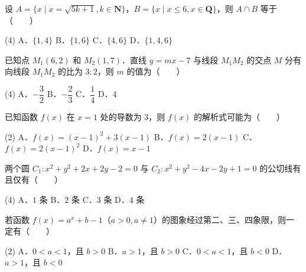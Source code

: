 

\begin{question}
设 $A = \{x \mid x = \sqrt{5k + 1}, k \in \mathbf{N}\}$，$B = \{x \mid x \leqslant 6, x \in \mathbf{Q}\}$，则 $A \cap B$ 等于\mbox{（　　）}

\begin{gkopts}(4)
\task A．$\{1, 4\}$
\task B．$\{1, 6\}$
\task C．$\{4, 6\}$
\task D．$\{1, 4, 6\}$
\end{gkopts}

\end{question}
\begin{question}
已知点 $M_1(6, 2)$ 和 $M_2(1, 7)$．直线 $y = mx - 7$ 与线段 $M_1M_2$ 的交点 $M$ 分有向线段 $M_1M_2$ 的比为 $3 : 2$，则 $m$ 的值为\mbox{（　　）}

\begin{gkopts}(4)
\task A．$-\dfrac{3}{2}$
\task B．$-\dfrac{2}{3}$
\task C．$\dfrac{1}{4}$
\task D．$4$
\end{gkopts}

\end{question}
\begin{question}
已知函数 $f(x)$ 在 $x = 1$ 处的导数为 $3$，则 $f(x)$ 的解析式可能为\mbox{（　　）}

\begin{gkopts}(2)
\task A．$f(x) = (x - 1)^2 + 3(x - 1)$
\task B．$f(x) = 2(x - 1)$
\task C．$f(x) = 2(x - 1)^2$
\task D．$f(x) = x - 1$
\end{gkopts}

\end{question}
\begin{question}
两个圆 $C_1: x^2 + y^2 + 2x + 2y - 2 = 0$ 与 $C_2: x^2 + y^2 - 4x - 2y + 1 = 0$ 的公切线有且仅有\mbox{（　　）}

\begin{gkopts}(4)
\task A．$1$ 条
\task B．$2$ 条
\task C．$3$ 条
\task D．$4$ 条
\end{gkopts}

\end{question}
\begin{question}
若函数 $f(x) = a^x + b - 1$（$a > 0, a \neq 1$）的图象经过第二、三、四象限，则一定有\mbox{（　　）}

\begin{gkopts}(2)
\task A．$0 < a < 1$，且 $b > 0$
\task B．$a > 1$，且 $b > 0$
\task C．$0 < a < 1$，且 $b < 0$
\task D．$a > 1$，且 $b < 0$
\end{gkopts}

\end{question}
